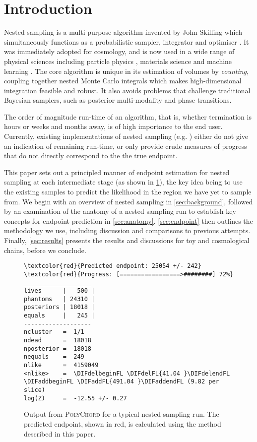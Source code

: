 \documentclass[usenatbib]{mnras}
\providecommand{\DIFaddtex}[1]{{\protect\color{blue}\uwave{#1}}} %
\providecommand{\DIFdeltex}[1]{{\protect\color{red}\sout{#1}}}                      %
\providecommand{\DIFaddFL}[1]{\DIFadd{#1}} %
\providecommand{\DIFdelFL}[1]{\DIFdel{#1}} %
\providecommand{\DIFaddbeginFL}{} %
\providecommand{\DIFaddendFL}{} %
\providecommand{\DIFdelbeginFL}{} %
\providecommand{\DIFdelendFL}{} %
\providecommand{\DIFadd}[1]{\texorpdfstring{\DIFaddtex{#1}}{#1}} %
\providecommand{\DIFdel}[1]{\texorpdfstring{\DIFdeltex{#1}}{}} %
\newcommand{\DIFscaledelfig}{0.5}
\newlength{\DIFdelgraphicswidth} %
\newlength{\DIFdelgraphicsheight} %
\newcommand{\DIFaddincludegraphics}[2][]{{\color{blue}\fbox{\DIFOincludegraphics[#1]{#2}}}} %
\newcommand{\DIFdelincludegraphics}[2][]{%
\sbox{\DIFdelgraphicsbox}{\DIFOincludegraphics[#1]{#2}}%
\settoboxwidth{\DIFdelgraphicswidth}{\DIFdelgraphicsbox} %
\settoboxtotalheight{\DIFdelgraphicsheight}{\DIFdelgraphicsbox} %
\scalebox{\DIFscaledelfig}{%
\parbox[b]{\DIFdelgraphicswidth}{\usebox{\DIFdelgraphicsbox}\\[-\baselineskip] \rule{\DIFdelgraphicswidth}{0em}}\llap{\resizebox{\DIFdelgraphicswidth}{\DIFdelgraphicsheight}{%
\setlength{\unitlength}{\DIFdelgraphicswidth}%
\begin{picture}(1,1)%
\thicklines\linethickness{2pt} %
{\color[rgb]{1,0,0}\put(0,0){\framebox(1,1){}}}%
{\color[rgb]{1,0,0}\put(0,0){\line( 1,1){1}}}%
{\color[rgb]{1,0,0}\put(0,1){\line(1,-1){1}}}%
\end{picture}%
}\hspace*{3pt}}} %
} %
\DeclareRobustCommand{\DIFaddbeginFL}{\DIFOaddbeginFL \let\includegraphics\DIFaddincludegraphics} %
\DeclareRobustCommand{\DIFaddendFL}{\DIFOaddendFL \let\includegraphics\DIFOincludegraphics} %
\DeclareRobustCommand{\DIFdelbeginFL}{\DIFOdelbeginFL \let\includegraphics\DIFdelincludegraphics} %
\DeclareRobustCommand{\DIFdelendFL}{\DIFOaddendFL \let\includegraphics\DIFOincludegraphics} %
\begin{document}
\section{Introduction}
Nested sampling is a multi-purpose algorithm invented by John Skilling which simultaneously functions as a probabilistic sampler, integrator and optimiser \citep{skilling}. It was immediately adopted for cosmology, and is now used in a wide range of physical sciences including particle physics \citep{Trotta_2008}, materials science \citep{materials} and machine learning \citep{sparse_reconstruction}. The core algorithm is unique in its estimation of volumes by \textit{counting}, coupling together nested Monte Carlo integrals which makes high-dimensional integration feasible and robust. It also avoids problems that challenge traditional Bayesian samplers, such as posterior multi-modality and phase transitions.
\par
The order of magnitude run-time of an algorithm, that is, whether termination is hours or weeks and months away, is of high importance to the end user. Currently, existing implementations of nested sampling (e.g. \citealt{multinest, polychord, dnest, dynesty, ultranest, nessai,proxnest}) either do not give an indication of remaining run-time, or only provide crude measures of progress that do not directly correspond to the the true endpoint.
\par
This paper sets out a principled manner of endpoint estimation for nested sampling at each intermediate stage (as shown in \cref{fig:polychord_output}), the key idea being to use the existing samples to predict the likelihood in the region we have yet to sample from. We begin with an overview of nested sampling in \cref{sec:background}, followed by an examination of the anatomy of a nested sampling run to establish key concepts for endpoint prediction in \cref{sec:anatomy}. \cref{sec:endpoint} then outlines the methodology we use, including discussion and comparisons to previous attempts. Finally, \cref{sec:results} presents the results and discussions for toy and cosmological chains, before we conclude.
\begin{figure}
\begin{Verbatim}[frame=single, commandchars=\\\{\}]
\textcolor{red}{Predicted endpoint: 25054 +/- 242}
\textcolor{red}{Progress: [=================>########] 72%}
___________________
lives      |   500 |
phantoms   | 24310 |
posteriors | 18018 |
equals     |   245 |
-------------------
ncluster   =  1/1
ndead      =  18018
nposterior =  18018
nequals    =  249
nlike      =  4159049
<nlike>    =  \DIFdelbeginFL \DIFdelFL{41.04 }\DIFdelendFL \DIFaddbeginFL \DIFaddFL{491.04 }\DIFaddendFL (9.82 per slice)
log(Z)     =  -12.55 +/- 0.27
\end{Verbatim}
\caption{Output from \textsc{PolyChord} for a typical nested sampling run. The predicted endpoint, shown in red, is calculated using the method described in this paper.}
\label{fig:polychord_output}
\end{figure}
\end{document}
